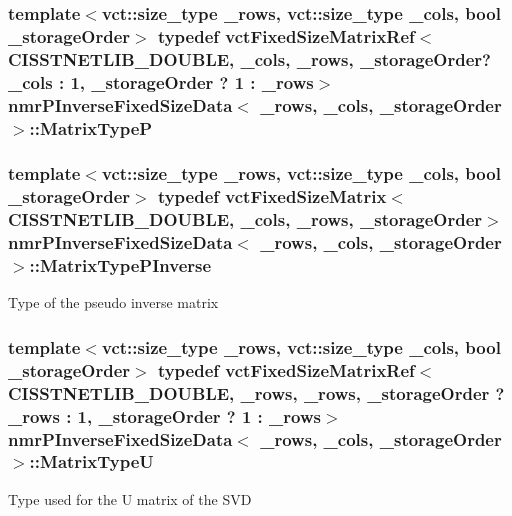 \subsubsection[{Matrix\+Type\+P}]{\setlength{\rightskip}{0pt plus 5cm}template$<$vct\+::size\+\_\+type \+\_\+rows, vct\+::size\+\_\+type \+\_\+cols, bool \+\_\+storage\+Order$>$ typedef {\bf vct\+Fixed\+Size\+Matrix\+Ref}$<$C\+I\+S\+S\+T\+N\+E\+T\+L\+I\+B\+\_\+\+D\+O\+U\+B\+L\+E, \+\_\+cols, \+\_\+rows, \+\_\+storage\+Order? \+\_\+cols \+: 1, \+\_\+storage\+Order ? 1 \+: \+\_\+rows$>$ {\bf nmr\+P\+Inverse\+Fixed\+Size\+Data}$<$ \+\_\+rows, \+\_\+cols, \+\_\+storage\+Order $>$\+::{\bf Matrix\+Type\+P}}\label{classnmr_p_inverse_fixed_size_data_abbeb86284eb856bc18f108e80906b04d}
\hypertarget{classnmr_p_inverse_fixed_size_data_a6c4787ecd9e2e7155fd857fb4427c7b0}{}
\subsubsection[{Matrix\+Type\+P\+Inverse}]{\setlength{\rightskip}{0pt plus 5cm}template$<$vct\+::size\+\_\+type \+\_\+rows, vct\+::size\+\_\+type \+\_\+cols, bool \+\_\+storage\+Order$>$ typedef {\bf vct\+Fixed\+Size\+Matrix}$<$C\+I\+S\+S\+T\+N\+E\+T\+L\+I\+B\+\_\+\+D\+O\+U\+B\+L\+E, \+\_\+cols, \+\_\+rows, \+\_\+storage\+Order$>$ {\bf nmr\+P\+Inverse\+Fixed\+Size\+Data}$<$ \+\_\+rows, \+\_\+cols, \+\_\+storage\+Order $>$\+::{\bf Matrix\+Type\+P\+Inverse}}\label{classnmr_p_inverse_fixed_size_data_a6c4787ecd9e2e7155fd857fb4427c7b0}
Type of the pseudo inverse matrix \hypertarget{classnmr_p_inverse_fixed_size_data_aef6864d119646cca01fc7a27d9eec4fa}{}
\subsubsection[{Matrix\+Type\+U}]{\setlength{\rightskip}{0pt plus 5cm}template$<$vct\+::size\+\_\+type \+\_\+rows, vct\+::size\+\_\+type \+\_\+cols, bool \+\_\+storage\+Order$>$ typedef {\bf vct\+Fixed\+Size\+Matrix\+Ref}$<$C\+I\+S\+S\+T\+N\+E\+T\+L\+I\+B\+\_\+\+D\+O\+U\+B\+L\+E, \+\_\+rows, \+\_\+rows, \+\_\+storage\+Order ? \+\_\+rows \+: 1, \+\_\+storage\+Order ? 1 \+: \+\_\+rows$>$ {\bf nmr\+P\+Inverse\+Fixed\+Size\+Data}$<$ \+\_\+rows, \+\_\+cols, \+\_\+storage\+Order $>$\+::{\bf Matrix\+Type\+U}}\label{classnmr_p_inverse_fixed_size_data_aef6864d119646cca01fc7a27d9eec4fa}
Type used for the U matrix of the S\+V\+D \hypertarget{classnmr_p_inverse_fixed_size_data_a61bc7c8325cf61f5c530759364ce185a}{}
